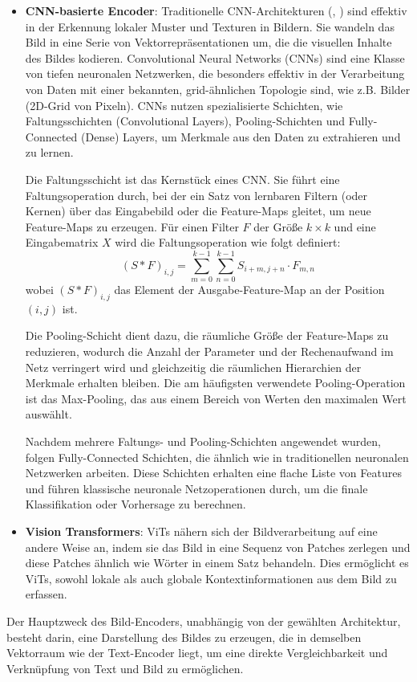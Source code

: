 \documentclass[nolibertine, ngerman, algorithm, nomencl, minted]{ttlab-qualify}
\begin{document}
\begin{itemize}
    \item \textbf{CNN-basierte Encoder}: Traditionelle CNN-Architekturen (\textcite{lecun2015deep}, \textcite{krizhevsky2012imagenet}) 
	sind effektiv in der Erkennung lokaler Muster und Texturen in Bildern. Sie wandeln das Bild in eine Serie von 
	Vektorrepräsentationen um, die die visuellen Inhalte des Bildes kodieren.
    Convolutional Neural Networks (CNNs) sind eine Klasse von tiefen neuronalen Netzwerken, 
	die besonders effektiv in der Verarbeitung von Daten mit einer bekannten, grid-ähnlichen 
	Topologie sind, wie z.B. Bilder (2D-Grid von Pixeln). CNNs nutzen spezialisierte Schichten, 
	wie Faltungsschichten (Convolutional Layers), Pooling-Schichten und Fully-Connected (Dense) Layers, 
	um Merkmale aus den Daten zu extrahieren und zu lernen.

	Die Faltungsschicht ist das Kernstück eines CNN. Sie führt eine Faltungsoperation durch, 
	bei der ein Satz von lernbaren Filtern (oder Kernen) über das Eingabebild oder die Feature-Maps 
	gleitet, um neue Feature-Maps zu erzeugen. Für einen Filter \(F\) der Größe \(k \times k\) und 
	eine Eingabematrix \(X\) wird die Faltungsoperation wie folgt definiert:
	\begin{equation*}
		(S * F)_{i,j} = \sum_{m=0}^{k-1} \sum_{n=0}^{k-1} S_{i+m, j+n} \cdot F_{m,n}
	\end{equation*}
	wobei \((S * F)_{i,j}\) das Element der Ausgabe-Feature-Map an der Position \((i, j)\) ist.
	
	Die Pooling-Schicht dient dazu, die räumliche Größe der Feature-Maps zu reduzieren, 
	wodurch die Anzahl der Parameter und der Rechenaufwand im Netz verringert wird und 
	gleichzeitig die räumlichen Hierarchien der Merkmale erhalten bleiben. Die am häufigsten 
	verwendete Pooling-Operation ist das Max-Pooling, das aus einem Bereich von Werten den maximalen Wert auswählt.

	Nachdem mehrere Faltungs- und Pooling-Schichten angewendet wurden, folgen Fully-Connected Schichten, 
	die ähnlich wie in traditionellen neuronalen Netzwerken arbeiten. Diese Schichten erhalten eine flache 
	Liste von Features und führen klassische neuronale Netzoperationen durch, um die finale Klassifikation 
	oder Vorhersage zu berechnen.

	\item \textbf{Vision Transformers}: ViTs nähern sich der Bildverarbeitung auf eine andere Weise an, indem sie das Bild in eine Sequenz von Patches zerlegen und diese Patches ähnlich wie Wörter in einem Satz behandeln. Dies ermöglicht es ViTs, sowohl lokale als auch globale Kontextinformationen aus dem Bild zu erfassen.
\end{itemize}
Der Hauptzweck des Bild-Encoders, unabhängig von der gewählten Architektur, besteht darin, 
eine Darstellung des Bildes zu erzeugen, die in demselben Vektorraum wie der Text-Encoder liegt, 
um eine direkte Vergleichbarkeit und Verknüpfung von Text und Bild zu ermöglichen.
\end{document}
